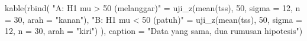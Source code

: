 \documentclass[
  indonesian,
  letterpaper,
]{book}
\newenvironment{Shaded}{\begin{snugshade}}{\end{snugshade}}
\newcommand{\AttributeTok}[1]{\textcolor[rgb]{0.40,0.45,0.13}{#1}}
\newcommand{\DecValTok}[1]{\textcolor[rgb]{0.68,0.00,0.00}{#1}}
\newcommand{\FunctionTok}[1]{\textcolor[rgb]{0.28,0.35,0.67}{#1}}
\newcommand{\NormalTok}[1]{\textcolor[rgb]{0.00,0.23,0.31}{#1}}
\newcommand{\OtherTok}[1]{\textcolor[rgb]{0.00,0.23,0.31}{#1}}
\newcommand{\StringTok}[1]{\textcolor[rgb]{0.13,0.47,0.30}{#1}}
\begin{document}
\begin{Shaded}
\begin{Highlighting}[]
\FunctionTok{kable}\NormalTok{(}\FunctionTok{rbind}\NormalTok{(}
  \StringTok{"A: H1 mu \textgreater{} 50 (melanggar)"} \OtherTok{=} \FunctionTok{uji\_z}\NormalTok{(}\FunctionTok{mean}\NormalTok{(tss), }\DecValTok{50}\NormalTok{, }\AttributeTok{sigma =} \DecValTok{12}\NormalTok{, }\AttributeTok{n =} \DecValTok{30}\NormalTok{, }\AttributeTok{arah =} \StringTok{"kanan"}\NormalTok{),}
  \StringTok{"B: H1 mu \textless{} 50 (patuh)"}     \OtherTok{=} \FunctionTok{uji\_z}\NormalTok{(}\FunctionTok{mean}\NormalTok{(tss), }\DecValTok{50}\NormalTok{, }\AttributeTok{sigma =} \DecValTok{12}\NormalTok{, }\AttributeTok{n =} \DecValTok{30}\NormalTok{, }\AttributeTok{arah =} \StringTok{"kiri"}\NormalTok{)}
\NormalTok{), }\AttributeTok{caption =} \StringTok{"Data yang sama, dua rumusan hipotesis"}\NormalTok{)}
\end{Highlighting}
\end{Shaded}
\end{document}
